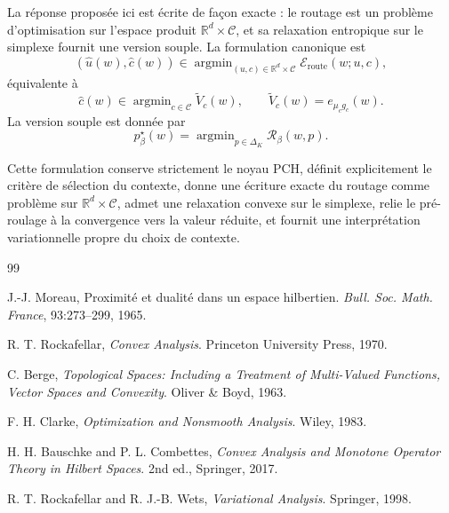 \documentclass[11pt,a4paper]{article}
\DeclareMathOperator{\argmin}{argmin}
\newcommand{\R}{\mathbb R}
\newcommand{\Ccal}{\mathcal C}
\newcommand{\Rcal}{\mathcal R}
\begin{document}
La réponse proposée ici est écrite de façon exacte : le routage est un problème d'optimisation sur l'espace produit \(\R^d\times\Ccal\), et sa relaxation entropique sur le simplexe fournit une version souple. La formulation canonique est
\[
(\hat u(w),\hat c(w))\in\argmin_{(u,c)\in\R^d\times\Ccal}\mathcal E_{\mathrm{route}}(w;u,c),
\]
équivalente à
\[
\hat c(w)\in\argmin_{c\in\Ccal}\widetilde V_c(w),
\qquad
\widetilde V_c(w)=e_{\mu_c g_c}(w).
\]
La version souple est donnée par
\[
 p^\star_\beta(w)
 =
\argmin_{p\in\Delta_K}\Rcal_\beta(w,p).
\]

Cette formulation conserve strictement le noyau PCH, définit explicitement le critère de sélection du contexte, donne une écriture exacte du routage comme problème sur \(\R^d\times\Ccal\), admet une relaxation convexe sur le simplexe, relie le pré-roulage à la convergence vers la valeur réduite, et fournit une interprétation variationnelle propre du choix de contexte.

\begin{thebibliography}{99}

J.-J. Moreau,
\newblock Proximité et dualité dans un espace hilbertien.
\newblock \emph{Bull. Soc. Math. France}, 93:273--299, 1965.

R. T. Rockafellar,
\newblock \emph{Convex Analysis}.
\newblock Princeton University Press, 1970.

C. Berge,
\newblock \emph{Topological Spaces: Including a Treatment of Multi-Valued Functions, Vector Spaces and Convexity}.
\newblock Oliver \& Boyd, 1963.

F. H. Clarke,
\newblock \emph{Optimization and Nonsmooth Analysis}.
\newblock Wiley, 1983.

H. H. Bauschke and P. L. Combettes,
\newblock \emph{Convex Analysis and Monotone Operator Theory in Hilbert Spaces}.
\newblock 2nd ed., Springer, 2017.

R. T. Rockafellar and R. J.-B. Wets,
\newblock \emph{Variational Analysis}.
\newblock Springer, 1998.

\end{thebibliography}
\end{document}
